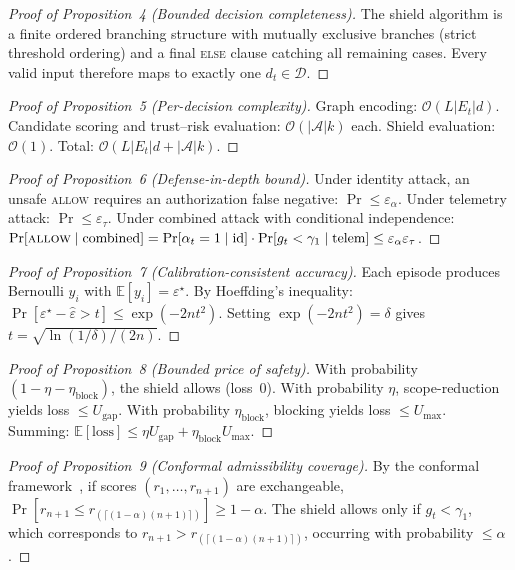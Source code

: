 \documentclass[lettersize,journal]{IEEEtran}
\begin{document}
\begin{proof}[Proof of Proposition~4 (Bounded decision completeness)]
The shield algorithm is a finite ordered branching structure with mutually exclusive branches (strict threshold ordering) and a final \textsc{else} clause catching all remaining cases.
Every valid input therefore maps to exactly one $d_t \in \mathcal{D}$.
\end{proof}

\begin{proof}[Proof of Proposition~5 (Per-decision complexity)]
Graph encoding: $\mathcal{O}(L|E_t|d)$.
Candidate scoring and trust--risk evaluation: $\mathcal{O}(|\mathcal{A}|k)$ each.
Shield evaluation: $\mathcal{O}(1)$.
Total: $\mathcal{O}(L|E_t|d + |\mathcal{A}|k)$.
\end{proof}

\begin{proof}[Proof of Proposition~6 (Defense-in-depth bound)]
Under identity attack, an unsafe \textsc{allow} requires an authorization false negative: $\Pr \le \varepsilon_\alpha$.
Under telemetry attack: $\Pr \le \varepsilon_\tau$.
Under combined attack with conditional independence:
$\Pr[\textsc{allow} \mid \text{combined}] = \Pr[\alpha_t=1 \mid \text{id}] \cdot \Pr[g_t<\gamma_1 \mid \text{telem}] \le \varepsilon_\alpha \varepsilon_\tau$.
\end{proof}

\begin{proof}[Proof of Proposition~7 (Calibration-consistent accuracy)]
Each episode produces Bernoulli $y_i$ with $\mathbb{E}[y_i]=\varepsilon^\star$.
By Hoeffding's inequality: $\Pr[\varepsilon^\star - \hat\varepsilon > t] \le \exp(-2nt^2)$.
Setting $\exp(-2nt^2)=\delta$ gives $t=\sqrt{\ln(1/\delta)/(2n)}$.
\end{proof}

\begin{proof}[Proof of Proposition~8 (Bounded price of safety)]
With probability $(1-\eta-\eta_{\mathrm{block}})$, the shield allows (loss~0).
With probability $\eta$, scope-reduction yields loss $\le U_{\mathrm{gap}}$.
With probability $\eta_{\mathrm{block}}$, blocking yields loss $\le U_{\max}$.
Summing: $\mathbb{E}[\text{loss}] \le \eta U_{\mathrm{gap}} + \eta_{\mathrm{block}} U_{\max}$.
\end{proof}

\begin{proof}[Proof of Proposition~9 (Conformal admissibility coverage)]
By the conformal framework~\cite{angelopoulos2023conformal}, if scores $(r_1,\ldots,r_{n+1})$ are exchangeable, $\Pr[r_{n+1} \le r_{(\lceil(1-\alpha)(n+1)\rceil)}] \ge 1-\alpha$.
The shield allows only if $g_t < \gamma_1$, which corresponds to $r_{n+1} > r_{(\lceil(1-\alpha)(n+1)\rceil)}$, occurring with probability $\le \alpha$.
\end{proof}
\end{document}
